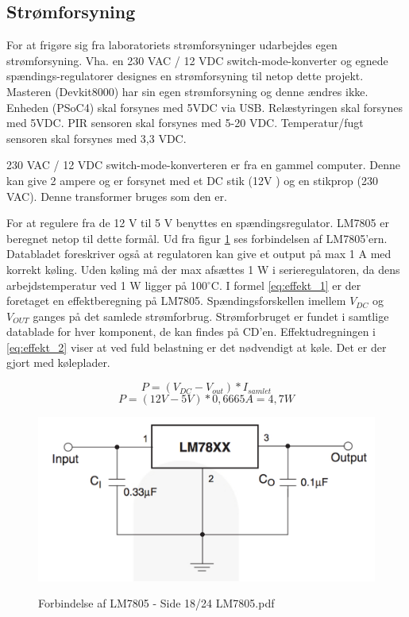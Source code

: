 \subsection{Strømforsyning}

For at frigøre sig fra laboratoriets strømforsyninger udarbejdes egen strømforsyning. Vha. en 230 VAC / 12 VDC switch-mode-konverter og egnede spændings-regulatorer designes en strømforsyning til netop dette projekt. Masteren (Devkit8000) har sin egen strømforsyning og denne ændres ikke. Enheden (PSoC4) skal forsynes med 5VDC via USB. Relæstyringen skal forsynes med 5VDC. PIR sensoren skal forsynes med 5-20 VDC. Temperatur/fugt sensoren skal forsynes med 3,3 VDC. 

230 VAC / 12 VDC switch-mode-konverteren er fra en gammel computer. Denne kan give 2 ampere og er forsynet med et DC stik (12V ) og en stikprop (230 VAC). Denne transformer bruges som den er. 

For at regulere fra de 12 V til 5 V benyttes en spændingsregulator. LM7805 er beregnet netop til dette formål. Ud fra figur \ref{lab:LM7805} ses forbindelsen af LM7805'ern. Databladet foreskriver også at regulatoren kan give et output på max 1 A med korrekt køling.  
\newline
Uden køling må der max afsættes 1 W i serieregulatoren, da dens arbejdstemperatur ved 1 W ligger på 100$^{\circ}$C.  I formel \ref{eq:effekt_1} er der foretaget en effektberegning på LM7805. Spændingsforskellen imellem $V_{DC}$ og $V_{OUT}$ ganges på det samlede strømforbrug. Strømforbruget er fundet i samtlige datablade for hver komponent, de kan findes på CD'en. Effektudregningen i \ref{eq:effekt_2} viser at ved fuld belastning er det nødvendigt at køle. Det er der gjort med køleplader. 

\begin{equation} 
P = (V_{DC}-V_{out})*I_{samlet} 
\label{eq:effekt_1}
\end{equation}
\begin{equation} 
P = (12V - 5V)*0,6665 A= 4,7 W 
\label{eq:effekt_2}
\end{equation}

\begin{figure}[H] \centering
{\includegraphics[width=\textwidth]{filer/design/Billeder/LM7805_DATASHEET}}
\caption{Forbindelse af LM7805 - Side 18/24 LM7805.pdf}
\label{lab:LM7805}
\raggedright
\end{figure}

